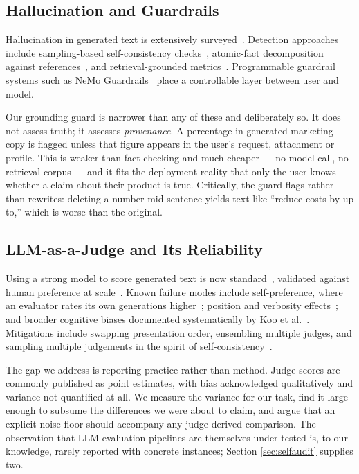 \documentclass[journal]{IEEEtran}
\begin{document}
\subsection{Hallucination and Guardrails}
Hallucination in generated text is extensively
surveyed~\cite{ji2023hallucination}. Detection approaches include
sampling-based self-consistency checks~\cite{manakul2023selfcheckgpt},
atomic-fact decomposition against references~\cite{min2023factscore}, and
retrieval-grounded metrics~\cite{es2024ragas}. Programmable guardrail systems
such as NeMo Guardrails~\cite{rebedea2023nemo} place a controllable layer
between user and model.

Our grounding guard is narrower than any of these and deliberately so. It does
not assess truth; it assesses \emph{provenance}. A percentage in generated
marketing copy is flagged unless that figure appears in the user's request,
attachment or profile. This is weaker than fact-checking and much cheaper ---
no model call, no retrieval corpus --- and it fits the deployment reality that
only the user knows whether a claim about their product is true. Critically, the
guard flags rather than rewrites: deleting a number mid-sentence yields text
like ``reduce costs by up to,'' which is worse than the original.

\subsection{LLM-as-a-Judge and Its Reliability}
Using a strong model to score generated text is now
standard~\cite{zheng2023judging, liu2023geval}, validated against human
preference at scale~\cite{chiang2024arena}. Known failure modes include
self-preference, where an evaluator rates its own
generations higher~\cite{panickssery2024selfpref}; position and verbosity
effects~\cite{wang2023fair}; and broader cognitive biases documented
systematically by Koo et al.~\cite{koo2023benchmarking}. Mitigations include
swapping presentation order, ensembling multiple judges, and sampling multiple
judgements in the spirit of self-consistency~\cite{wang2023selfconsistency}.

The gap we address is reporting practice rather than method. Judge scores are
commonly published as point estimates, with bias acknowledged qualitatively and
variance not quantified at all. We measure the variance for our task, find it
large enough to subsume the differences we were about to claim, and argue that
an explicit noise floor should accompany any judge-derived comparison. The
observation that LLM evaluation pipelines are themselves under-tested is, to
our knowledge, rarely reported with concrete instances; Section
\ref{sec:selfaudit} supplies two.
\end{document}
